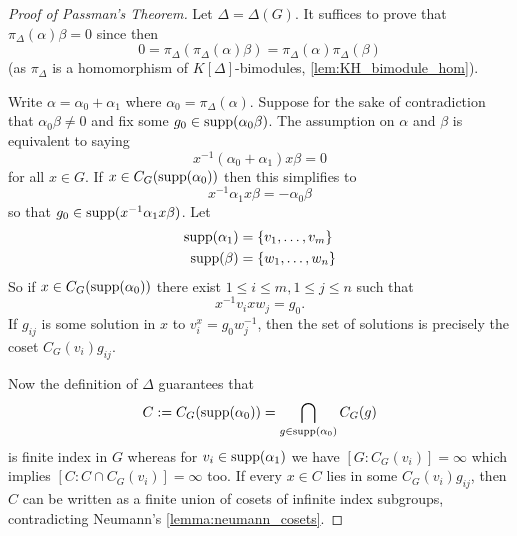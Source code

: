 \begin{proof}[Proof of Passman's Theorem]
    Let $\Delta = \Delta(G)$.
    It suffices to prove that $\pi_\Delta(\alpha) \beta = 0$ since then \[
        0 = \pi_\Delta\left( \pi_\Delta(\alpha) \beta \right) = \pi_\Delta(\alpha) \pi_\Delta(\beta)
    \] (as $\pi_\Delta$ is a homomorphism of $K[\Delta]$-bimodules, \cref{lem:KH_bimodule_hom}).

    Write $\alpha = \alpha_0 + \alpha_1$ where $\alpha_0 = \pi_\Delta(\alpha)$.
    Suppose for the sake of contradiction that $\alpha_0 \beta \neq 0$ and fix some $g_0 \in \operatorname{supp}(\alpha_0 \beta)$.
    The assumption on $\alpha$ and $\beta$ is equivalent to saying \[
        x^{-1} (\alpha_0 + \alpha_1) x \beta = 0
    \] for all $x \in G$.
    If $x \in C_G(\operatorname{supp}(\alpha_0))$ then this simplifies to \[
        x^{-1} \alpha_1 x \beta = - \alpha_0 \beta
    \] so that $g_0 \in \operatorname{supp}(x^{-1} \alpha_1 x \beta)$.
    Let
    \begin{align*}
        \operatorname{supp}(\alpha_1) &= \{ v_1, \dots, v_m \} \\
        \operatorname{supp}(\beta) &= \{ w_1, \dots, w_n \}
    \end{align*}
    So if $x \in C_G(\operatorname{supp}(\alpha_0))$ there exist $1 \leq i \leq m, 1 \leq j \leq n$ such that \[
        x^{-1} v_i x w_j = g_0.
    \]
    If $g_{ij}$ is some solution in $x$ to $v_i^x = g_0 w_j^{-1}$, then the set of solutions is precisely the coset $C_G(v_i) g_{ij}$.

    Now the definition of $\Delta$ guarantees that \[
        C := C_G(\operatorname{supp}(\alpha_0)) = \bigcap_{g \in \operatorname{supp}(\alpha_0)} C_G(g)
    \] is finite index in $G$ whereas for $v_i \in \operatorname{supp}(\alpha_1)$ we have $[G : C_G(v_i)] = \infty$ which implies $[C : C \cap C_G(v_i)] = \infty$ too.
    If every $x \in C$ lies in some $C_G(v_i) g_{ij}$, then $C$ can be written as a finite union of cosets of infinite index subgroups, contradicting Neumann's \cref{lemma:neumann_cosets}.

\end{proof}
